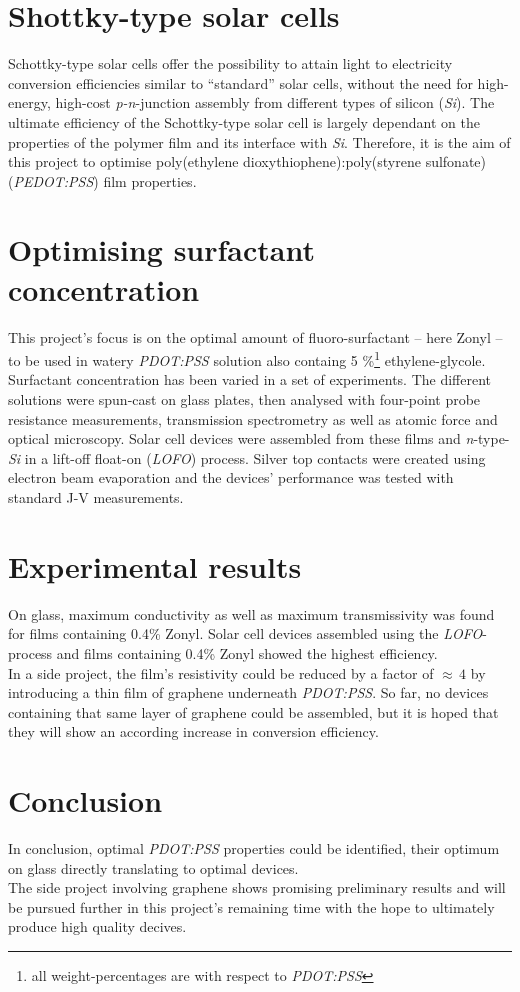 \documentclass[a4paper,10pt]{article}
\begin{document}
\section*{Shottky-type solar cells}
Schottky-type solar cells offer the possibility to attain light to electricity conversion efficiencies similar to ``standard'' solar cells, without the need for high-energy, high-cost \emph{p-n}-junction assembly from different types of silicon (\emph{Si}). The ultimate efficiency of the Schottky-type solar cell is largely dependant on the properties of the polymer film and its interface with \emph{Si}. Therefore, it is the aim of this project to optimise poly(ethylene dioxythiophene):poly(styrene sulfonate) (\emph{PEDOT:PSS}) film properties.
\section*{Optimising surfactant concentration}
This project's focus is on the optimal amount of fluoro-surfactant -- here Zonyl\textsuperscript{\textregistered} -- to be used in watery \emph{PDOT:PSS} solution also containg 5 \%\footnote{all weight-percentages are with respect to \emph{PDOT:PSS}} ethylene-glycole. Surfactant concentration has been varied in a set of experiments. The different solutions were spun-cast on glass plates, then analysed with four-point probe resistance measurements, transmission spectrometry as well as atomic force and optical microscopy. Solar cell devices were assembled from these films and \emph{n}-type-\emph{Si} in a lift-off float-on (\emph{LOFO}) process. Silver top contacts were created using electron beam evaporation and the devices' performance was tested with standard J-V measurements.
\section*{Experimental results}
On glass, maximum conductivity as well as maximum transmissivity was found for films containing 0.4\% Zonyl. Solar cell devices assembled using the \emph{LOFO}-process and films containing 0.4\% Zonyl showed the highest efficiency.\\
In a side project, the film's resistivity could be reduced by a factor of $\approx \, 4$ by introducing a thin film of graphene underneath \emph{PDOT:PSS}. So far, no devices containing that same layer of graphene could be assembled, but it is hoped that they will show an according increase in conversion efficiency. 
\section*{Conclusion}
In conclusion, optimal \emph{PDOT:PSS} properties could be identified, their optimum on glass directly translating to optimal devices.\\
The side project involving graphene shows promising preliminary results and will be pursued further in this project's remaining time with the hope to ultimately produce high quality decives.
\end{document}
